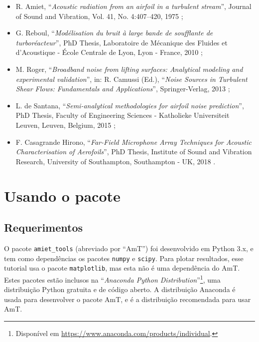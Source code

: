 \documentclass[a4paper, 11pt, twoside]{article}
\begin{document}
\begin{itemize}
	\item R. Amiet, ``\emph{Acoustic radiation from an airfoil in a turbulent stream}'', Journal of Sound and Vibration, Vol. 41, No. 4:407–420, 1975 \cite{Amiet75};
	
	\item G. Reboul, ``\emph{Modélisation du bruit à large bande de soufflante de turboréacteur}'', PhD Thesis, Laboratoire de Mécanique des Fluides et d’Acoustique - École Centrale de Lyon, Lyon - France, 2010 \cite{Reboul10};
	
	\item M. Roger, ``\emph{Broadband noise from lifting surfaces: Analytical modeling and experimental validation}'', in: R. Camussi (Ed.), ``\emph{Noise Sources in Turbulent Shear Flows: Fundamentals and Applications}'', Springer-Verlag, 2013 \cite{Roger13};
	
	\item L. de Santana, ``\emph{Semi-analytical methodologies for airfoil noise prediction}'', PhD Thesis, Faculty of Engineering Sciences - Katholieke Universiteit Leuven, Leuven, Belgium, 2015 \cite{deSantana2015};
	
	\item F. Casagrande Hirono, ``\emph{Far-Field Microphone Array Techniques for Acoustic Characterisation of Aerofoils}'', PhD Thesis, Institute of Sound and Vibration Research, University of Southampton, Southampton - UK, 2018 \cite{Casagrande18}.
\end{itemize}




\section{Usando o pacote}

\subsection{Requerimentos}

O pacote \verb|amiet_tools| (abreviado por ``AmT'') foi desenvolvido em Python 3.x, e tem como dependências os pacotes \verb|numpy| e \verb|scipy|. Para plotar resultados, esse tutorial usa o pacote \verb|matplotlib|, mas esta não é uma dependência do AmT. Estes pacotes estão inclusos na ``\emph{Anaconda Python Distribution}''\footnote{Disponível em \url{https://www.anaconda.com/products/individual}.}, uma distribuição Python gratuita e de código aberto. A distribuição Anaconda é usada para desenvolver o pacote AmT, e é a distribuição recomendada para usar AmT.
\end{document}
